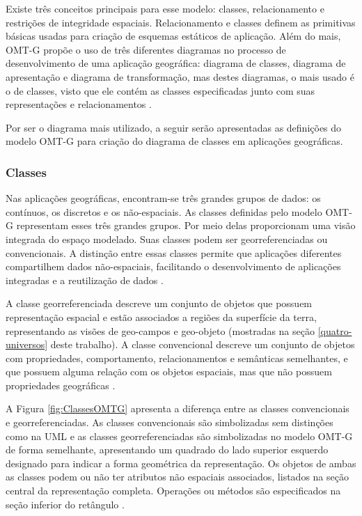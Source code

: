 Existe três conceitos principais para esse modelo: classes, relacionamento e restrições de integridade espaciais. Relacionamento e classes definem as primitivas básicas usadas para criação de esquemas estáticos de aplicação. Além do mais, OMT-G propõe o uso de três diferentes diagramas no processo de desenvolvimento de uma aplicação geográfica: diagrama de classes, diagrama de apresentação e diagrama de transformação, mas destes diagramas, o mais usado é o de classes, visto que ele contém as classes especificadas junto com suas representações e relacionamentos \cite{omtg}.

Por ser o diagrama mais utilizado, a seguir serão apresentadas as definições do modelo OMT-G para criação do diagrama de classes em aplicações geográficas.

\subsubsection{Classes}

Nas aplicações geográficas, encontram-se três grandes grupos de dados: os contínuos, os discretos e os não-espaciais. As classes definidas pelo modelo OMT-G representam esses três grandes grupos. Por meio delas proporcionam uma visão integrada do espaço modelado. Suas classes podem ser georreferenciadas ou convencionais. A distinção entre essas classes permite que aplicações diferentes compartilhem dados não-espaciais, facilitando o desenvolvimento de aplicações integradas e a reutilização de dados \cite{omtg}.

A classe georreferenciada descreve um conjunto de objetos que possuem representação espacial e estão associados a regiões da superfície da terra, representando as visões de geo-campos e geo-objeto (mostradas na seção \ref{quatro-universos} deste trabalho). A classe convencional descreve um conjunto de objetos com propriedades, comportamento, relacionamentos e semânticas semelhantes, e que possuem alguma relação com os objetos espaciais, mas que não possuem propriedades geográficas \cite{omtg}.

A Figura \ref{fig:ClassesOMTG} apresenta a diferença entre as classes convencionais e georreferenciadas. As classes convencionais são simbolizadas sem distinções como na UML e as classes georreferenciadas são simbolizadas no modelo OMT-G de forma semelhante, apresentando um quadrado do lado superior esquerdo designado para indicar a forma geométrica da representação. Os objetos de ambas as classes podem ou não ter atributos não espaciais associados, listados na seção central da representação completa. Operações ou métodos são especificados na seção inferior do retângulo \cite{omtg}.

